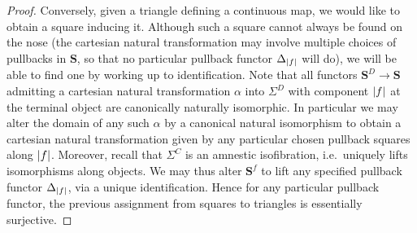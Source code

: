 \documentclass[11pt, oneside, article]{memoir}
\theoremstyle{plain}
\theoremstyle{definition}
\theoremstyle{remark}
\DeclarePairedDelimiter{\abs}{\lvert}{\rvert}
\newcommand{\bang}{\mathrm{!}}
\newcommand{\cat}[1]{\mathbf{#1}}
\newcommand{\CoalgOn}[2]{{#2}^{#1}}
\newcommand{\CoalgS}[1]{\CoalgOn{#1}{\bS}}
\newcommand{\pts}[1]{{\abs{#1}}}
\newcommand{\one}[1]{\pts{#1}}
\newcommand{\ptlift}[1]{\overline{#1}}
\newcommand{\carr}{\Sigma}
\newcommand{\reindex}[1]{\Delta_{#1}}
\newcommand{\car}[1]{\carr^{#1}}
\newcommand{\carC}{\car{\cC}}
\newcommand{\carD}{\car{\cD}}
\newcommand{\con}[2]{{#1}^{#2}}
\newcommand{\cmnd}[1]{{#1}}
\newcommand{\cC}{\cmnd{C}}
\newcommand{\cD}{\cmnd{D}}
\newcommand{\bS}{\cat{S}}
\newcommand{\DS}{\CoalgS{\cD}}
\begin{document}
\begin{proof}
  Conversely, given a triangle defining a continuous map, we would
  like to obtain a square inducing it. Although such a square cannot
  always be found on the nose (the cartesian natural transformation
  may involve multiple choices of pullbacks in $\bS$, so that no
  particular pullback functor $\reindex{\one{f}}$ will do), we will be able to
  find one by working up to identification. Note that all functors
  $\DS \to \bS$ admitting a cartesian natural transformation $\alpha$
  into $\carD$ with component $\one{f}$ at the terminal object are
  canonically naturally isomorphic. In particular we may alter the
  domain of any such $\alpha$ by a canonical natural isomorphism to
  obtain a cartesian natural transformation given by any particular
  chosen pullback squares along $\one{f}$. Moreover, recall that
  $\carC$ is an amnestic isofibration, i.e.\ uniquely lifts
  isomorphisms along objects. We may thus alter $\con{\bS}{f}$ to lift
  any specified pullback functor $\reindex{\one{f}}$, via a unique
  identification. Hence for any particular pullback functor, the
  previous assignment from squares to triangles is essentially
  surjective.


\end{proof}
\end{document}
